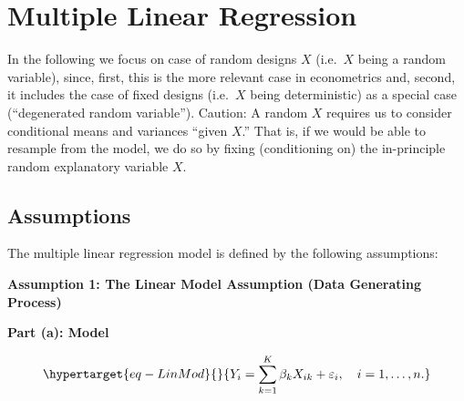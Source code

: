 \documentclass[
  letterpaper,
  DIV=11,
  numbers=noendperiod]{scrreprt}
\theoremstyle{definition}
\theoremstyle{plain}
\theoremstyle{plain}
\theoremstyle{remark}
\begin{document}

\hypertarget{sec-MLR}{%
\chapter{Multiple Linear Regression}\label{sec-MLR}}

In the following we focus on case of random designs \(X\) (i.e.~\(X\)
being a random variable), since, first, this is the more relevant case
in econometrics and, second, it includes the case of fixed designs
(i.e.~\(X\) being deterministic) as a special case (``degenerated random
variable''). Caution: A random \(X\) requires us to consider conditional
means and variances ``given \(X\).'' That is, if we would be able to
resample from the model, we do so by fixing (conditioning on) the
in-principle random explanatory variable \(X\).

\hypertarget{assumptions}{%
\section{Assumptions}\label{assumptions}}

The multiple linear regression model is defined by the following
assumptions:

\textbf{Assumption 1: The Linear Model Assumption (Data Generating
Process)}

\textbf{Part (a): Model}

\begin{equation}\protect\hypertarget{eq-LinMod}{}{
\begin{align}
  Y_i=\sum_{k=1}^K\beta_k X_{ik}+\varepsilon_i, \quad i=1,\dots,n.
\end{align}
}\label{eq-LinMod}\end{equation}
\end{document}
